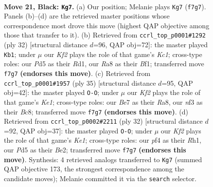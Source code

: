 \documentclass[11pt]{article}
\begin{document}
\clearpage

\begin{figure}[p]\centering
\begin{subfigure}{0.46\textwidth}\centering
\resizebox{\linewidth}{!}{%
\newchessgame
\chessboard[
  setfen={rnr5/ppp1bk2/q4pp1/P2p1b2/1P1P1P2/4PNP1/3Q4/RNB2RK1 b - - 0 21},
  showmover=false,
  pgfstyle=straightmove, color=movearrow, markmove={f7-g7}
]}
\caption{}
\end{subfigure}\hfill
\begin{subfigure}{0.46\textwidth}\centering
\resizebox{\linewidth}{!}{%
\newchessgame
\chessboard[
  setfen={r1r3k1/2q1bpp1/p1np1n1p/4pP2/4P3/2Q2P2/PPP1NB1P/2KR1B1R w - - 3 17},
  showmover=false,
  pgfstyle=straightmove, color=movearrow, markmove={c1-b1}
]}
\caption{}
\end{subfigure}
\\[4pt]
\begin{subfigure}{0.46\textwidth}\centering
\resizebox{\linewidth}{!}{%
\newchessgame
\chessboard[
  setfen={r1b1k2r/1p2ppb1/1qp3p1/p6p/P2P1P1P/R1P2NP1/1P1R2B1/2Q3K1 b kq - 0 18},
  showmover=false,
  pgfstyle=straightmove, color=movearrow, markmove={e8-g8}
]}
\caption{}
\end{subfigure}\hfill
\begin{subfigure}{0.46\textwidth}\centering
\resizebox{\linewidth}{!}{%
\newchessgame
\chessboard[
  setfen={r1bq3k/pp4pp/1nn1p3/5r2/5p2/1QP2N2/PP2BPPP/R1B1K2R w KQ - 6 17},
  showmover=false,
  pgfstyle=straightmove, color=movearrow, markmove={e1-g1}
]}
\caption{}
\end{subfigure}
\caption{\textbf{Move 21, Black: \texttt{Kg7}.} (a) Our position; Melanie plays \texttt{Kg7} (\texttt{f7g7}). Panels (b)--(d) are the retrieved master positions whose correspondence most drove this move (highest QAP objective among those that transfer to it). (b) Retrieved from \texttt{ccrl\_top\_p0001\#1292} (ply 32) [structural distance $d$=96, QAP obj=72]: the master played \texttt{Kb1}; under $\mu$ our \emph{Kf2} plays the role of that game's \emph{Kc1}; cross-type roles: our \emph{P}d5 as their \emph{R}d1, our \emph{R}a8 as their \emph{B}f1; transferred move \texttt{f7g7} \textbf{(endorses this move)}. (c) Retrieved from \texttt{ccrl\_top\_p0001\#1957} (ply 35) [structural distance $d$=95, QAP obj=42]: the master played \texttt{O-O}; under $\mu$ our \emph{Kf2} plays the role of that game's \emph{Ke1}; cross-type roles: our \emph{B}e7 as their \emph{R}a8, our \emph{n}f3 as their \emph{B}c8; transferred move \texttt{f7g7} \textbf{(endorses this move)}. (d) Retrieved from \texttt{ccrl\_top\_p0002\#2211} (ply 32) [structural distance $d$=92, QAP obj=37]: the master played \texttt{O-O}; under $\mu$ our \emph{Kf2} plays the role of that game's \emph{Ke1}; cross-type roles: our \emph{p}f4 as their \emph{R}h1, our \emph{P}d5 as their \emph{B}e2; transferred move \texttt{f7g7} \textbf{(endorses this move)}. Synthesis: 4 retrieved analogs transferred to \texttt{Kg7} (summed QAP objective 173, the strongest correspondence among the candidate moves); Melanie committed it via the \texttt{search} selector.}
\label{fig:thought-m41}
\end{figure}
\end{document}
